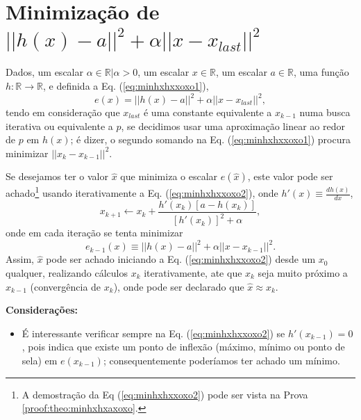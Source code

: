 \section{Minimização de $||h(x)-a||^2+\alpha ||x-x_{last}||^2$}


\begin{theorem}\label{theo:minhxhxxoxo}
Dados,
um escalar $\alpha \in \mathbb{R} | \alpha > 0$, 
um escalar $x \in \mathbb{R}$, 
um escalar $a \in \mathbb{R}$,  
uma função $h:\mathbb{R} \rightarrow \mathbb{R}$, e 
definida a Eq. (\ref{eq:minhxhxxoxo1}),
\begin{equation}\label{eq:minhxhxxoxo1}
e(x)=||h(x)-a||^2+\alpha ||x-x_{last}||^2,
\end{equation}
tendo em consideração que $x_{last}$ é uma constante equivalente a $x_{k-1}$
numa busca iterativa ou equivalente a $p$, 
se decidimos usar uma aproximação linear ao redor de $p$ em $h(x)$; 
é dizer, o segundo somando na Eq. (\ref{eq:minhxhxxoxo1}) 
procura minimizar $||x_{k}-x_{k-1}||^2$.

Se desejamos ter o valor $\hat{x}$ que minimiza o escalar $e(\hat{x})$,
este valor pode ser achado\footnote{A 
demostração da Eq (\ref{eq:minhxhxxoxo2}) pode ser vista na Prova \ref{proof:theo:minhxhxaxoxo}.} 
 usando iterativamente a Eq. (\ref{eq:minhxhxxoxo2}),
onde  $h'(x)\equiv \frac{d h(x)}{d x}$,
\begin{equation}\label{eq:minhxhxxoxo2}
x_{k+1} \leftarrow x_k+
\frac{ h'(x_k) \left[a-h(x_k)\right] }{\left[h'(x_k)\right]^2+\alpha},
\end{equation}
onde em cada iteração se tenta minimizar
\begin{equation}\label{eq:minhxhxxoxo2:ex}
e_{k-1}(x)  \equiv ||h(x)-a||^2 + \alpha||x-x_{k-1}||^2.
\end{equation}
Assim, $\hat{x}$ pode ser achado iniciando a Eq. (\ref{eq:minhxhxxoxo2}) desde um 
$x_{0}$ qualquer, realizando cálculos $x_{k}$ iterativamente, 
ate que $x_{k}$ seja muito próximo a $x_{k-1}$ (convergência de $x_{k}$),
onde pode ser declarado que $\hat{x} \approx x_{k}$.

\textbf{Considerações:}
\begin{itemize}
\item É interessante verificar sempre na Eq. (\ref{eq:minhxhxxoxo2}) 
se  $h'(x_{k-1}) = 0$,
pois indica que existe um ponto de inflexão 
(máximo, mínimo ou ponto de sela) em $e(x_{k-1})$;
consequentemente poderíamos ter achado um mínimo.
\end{itemize}

\end{theorem}

